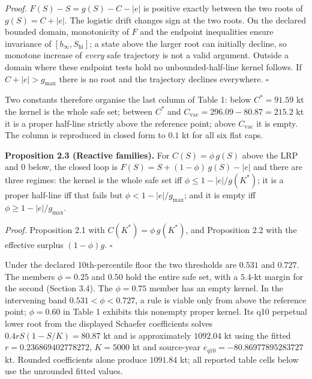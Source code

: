 \documentclass[11pt]{article}
\begin{document}
\emph{Proof.} \(F(S) - S = g(S) - C - |e|\) is positive exactly between the
two roots of \(g(S) = C + |e|\). The logistic drift changes sign at the two roots. On the declared
bounded domain, monotonicity of \(F\) and the endpoint inequalities
ensure invariance of \([b_\infty,S_{\mathrm{hi}}]\); a state
above the larger root can initially decline, so monotone increase of
\emph{every} safe trajectory is not a valid argument. Outside a domain
where these endpoint tests hold no unbounded-half-line kernel follows. If \(C + |e| > g_{\max}\)
there is no root and the trajectory declines everywhere. \ensuremath{\square}

Two constants therefore organise the last column of Table 1: below
\(C^* = 91.59\) kt the kernel is the whole safe set; between \(C^*\) and
\(C_{\mathrm{vac}} = 296.09 - 80.87 = 215.2\) kt it is a proper half-line
strictly above the reference point; above \(C_{\mathrm{vac}}\) it is empty.
The column is reproduced in closed form to \(0.1\) kt for all six flat caps.

\textbf{Proposition 2.3 (Reactive families).} For \(C(S) = \phi\, g(S)\)
above the LRP and 0 below, the closed loop is
\(F(S) = S + (1-\phi)\,g(S) - |e|\) and there are three regimes: the kernel
is the whole safe set iff \(\phi \le 1 - |e|/g(K^*)\); it is a proper
half-line iff that fails but \(\phi < 1 - |e|/g_{\max}\); and it is empty iff
\(\phi \ge 1 - |e|/g_{\max}\).

\emph{Proof.} Proposition 2.1 with \(C(K^*) = \phi\, g(K^*)\), and
Proposition 2.2 with the effective surplus \((1-\phi)g\). \ensuremath{\square}

Under the declared 10th-percentile floor the two thresholds are \(0.531\) and
\(0.727\). The members \(\phi = 0.25\) and \(0.50\) hold the entire safe
set, with a \(5.4\)-kt margin for the second (Section 3.4). The \(\phi = 0.75\)
member has an empty kernel. In the intervening band \(0.531 < \phi < 0.727\),
a rule is viable only from above the reference point; \(\phi=0.60\) in
Table 1 exhibits this nonempty proper kernel. Its q10 perpetual lower
root from the displayed Schaefer coefficients solves
\(0.4rS(1-S/K)=80.87\) kt and is approximately \(1092.04\) kt using the fitted
\(r=0.236869402778272\), \(K=5000\) kt and source-year
\(e_{q10}=-80.86977895283727\) kt. Rounded coefficients alone
produce \(1091.84\) kt; all reported table cells below use the
unrounded fitted values.
\end{document}
